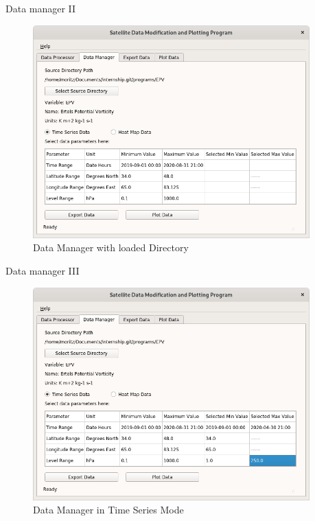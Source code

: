 \documentclass[
    hyperref={
        final,
        colorlinks=true,
        menucolor=black,
        anchorcolor=green,
        linkcolor=blue,
        citecolor=red,
        pdftitle={RS RAS Internship Presentation},
        pdfauthor={Moritz M. Konarski}
    }
]{beamer}
\begin{document}
\begin{frame}{Data manager II}
\begin{figure}
    \includegraphics[width=0.95\textwidth]{../graphics/dm02}
    \vspace{-8pt}
    \caption{Data Manager with loaded Directory}
\end{figure}
\end{frame}

\begin{frame}{Data manager III}
\begin{figure}
    \includegraphics[width=0.95\textwidth]{../graphics/dm03}
    \vspace{-8pt}
    \caption{Data Manager in Time Series Mode}
\end{figure}
\end{frame}
\end{document}
